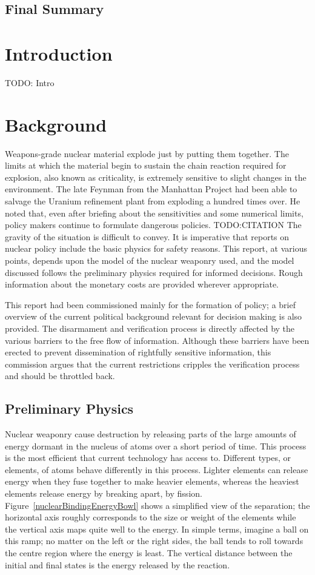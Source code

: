 \documentclass[twoside,titlepage,11pt,twocolumn,a4paper]{article}
\begin{document}
\subsection*{Final Summary}

\newpage
\tableofcontents
\twocolumn

\section{Introduction}
TODO: Intro
\section{Background}
Weapons-grade nuclear material explode just by putting them
together. The limits at which the material begin to sustain the chain
reaction required for explosion, also known as criticality, is
extremely sensitive to slight changes in the environment. The late
Feynman from the Manhattan Project had been able to salvage the
Uranium refinement plant from exploding a hundred times over. He noted
that, even after briefing about the sensitivities and some numerical
limits, policy makers continue to formulate dangerous
policies. TODO:CITATION The gravity of the situation is difficult to
convey. It is imperative that reports on nuclear policy include the
basic physics for safety reasons. This report, at various points,
depends upon the model of the nuclear weaponry used, and the model
discussed follows the preliminary physics required for informed
decisions. Rough information about the monetary costs are provided
wherever appropriate.

This report had been commissioned mainly for the formation of policy;
a brief overview of the current political background relevant for
decision making is also provided. The disarmament and verification
process is directly affected by the various barriers to the free flow
of information. Although these barriers have been erected to prevent
dissemination of rightfully sensitive information, this commission
argues that the current restrictions cripples the verification
process and should be throttled back. 

\subsection{Preliminary Physics}
Nuclear weaponry cause destruction by releasing parts of the large
amounts of energy dormant in the nucleus of atoms over a short period
of time. This process is the most efficient that current technology
has access to. Different types, or elements, of atoms behave
differently in this process. Lighter elements can release energy when
they fuse together to make heavier elements, whereas the heaviest
elements release energy by breaking apart, by
fission. Figure~\ref{nuclearBindingEnergyBowl} shows a simplified view
of the separation; the horizontal axis roughly corresponds to the size
or weight of the elements while the vertical axis maps quite well to
the energy. In simple terms, imagine a ball on this ramp; no matter on
the left or the right sides, the ball tends to roll towards the centre
region where the energy is least. The vertical distance between the
initial and final states is the energy released by the reaction.
\end{document}
